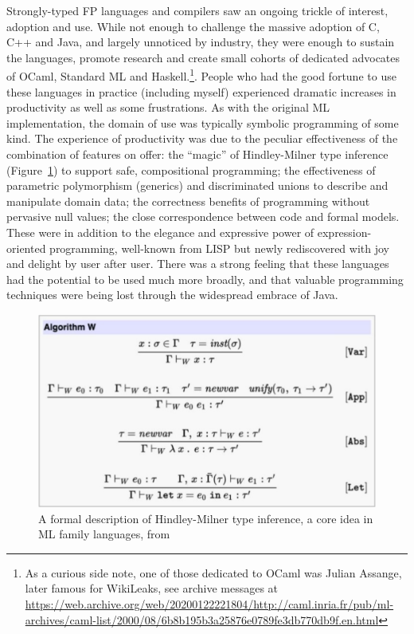 \documentclass[acmsmall]{acmart}\settopmatter{}
\begin{document}
Strongly-typed FP languages and compilers saw an ongoing trickle of interest, adoption and use. While not enough to challenge the massive adoption of C, C++ and Java,
and largely unnoticed by industry, they were enough to sustain the languages, promote research and create small cohorts of dedicated advocates of OCaml, Standard ML
and Haskell.\footnote{As a curious side note, one of those dedicated to OCaml was Julian Assange, later famous for WikiLeaks, see archive messages
at \url{https://web.archive.org/web/20200122221804/http://caml.inria.fr/pub/ml-archives/caml-list/2000/08/6b8b195b3a25876e0789fe3db770db9f.en.html}}.   People who had the good fortune to use these languages
in practice (including myself) experienced dramatic increases in productivity as well as some frustrations. As with the original ML implementation, the domain of use was
typically symbolic programming of some kind. The experience of productivity was due to the peculiar effectiveness of the combination of features on offer: the “magic”
of Hindley-Milner type inference (Figure~\ref{fig:hm}) to support safe, compositional programming; the effectiveness of parametric polymorphism (generics) and discriminated unions to describe
and manipulate domain data; the correctness benefits of programming without pervasive null values; the close correspondence between code and formal models. These were
in addition to the elegance and expressive power of expression-oriented programming, well-known from LISP but newly rediscovered with joy and delight by user after
user. There was a strong feeling that these languages had the potential to be used much more broadly, and that valuable programming techniques were being lost through
the widespread embrace of Java.  

\begin{figure}
  \begin{center}
  \includegraphics[width=0.9\linewidth]{hindley-milner.PNG}
  \end{center}
  \caption{A formal description of Hindley-Milner type inference, a core idea in ML family languages, from \citep{ReeseFSharpHistory}}
  \label{fig:hm}
\end{figure}
\end{document}
